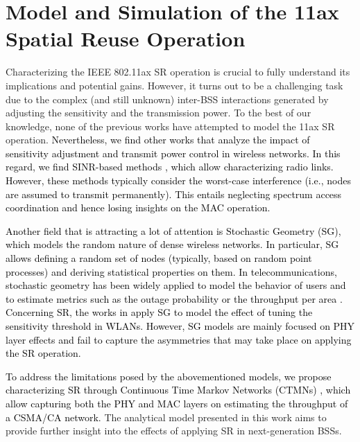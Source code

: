 \documentclass{article}
\begin{document}
\section{Model and Simulation of the 11ax Spatial Reuse Operation}
\label{section:analytical_model}

Characterizing the IEEE 802.11ax SR operation is crucial to fully understand its implications and potential gains. However, it turns out to be a challenging task due to the complex (and still unknown) inter-BSS interactions generated by adjusting the sensitivity and the transmission power. To the best of our knowledge, none of the previous works have attempted to model the 11ax SR operation. \textcolor{black}{Nevertheless, we find other works that analyze the impact of sensitivity adjustment and transmit power control in wireless networks. In this regard, we find SINR-based methods \cite{gupta2000capacity, guo2003spatial}, which allow characterizing radio links. However, these methods typically consider the worst-case interference (i.e., nodes are assumed to transmit permanently). This entails neglecting spectrum access coordination and hence losing insights on the MAC operation.}

\textcolor{black}{Another field that is attracting a lot of attention is Stochastic Geometry (SG), which models the random nature of dense wireless networks. In particular, SG allows defining a random set of nodes (typically, based on random point processes) and deriving statistical properties on them. In telecommunications, stochastic geometry has been widely applied to model the behavior of users and to estimate metrics such as the outage probability or the throughput per area \cite{elsawy2016modeling}. Concerning SR, the works in \cite{zhao2016stochastic, zhang2015stochastic, iwata2019stochastic} apply SG to model the effect of tuning the sensitivity threshold in WLANs. However, SG models are mainly focused on PHY layer effects and fail to capture the asymmetries that may take place on applying the SR operation.}

\textcolor{black}{To address the limitations posed by the abovementioned models, we propose characterizing SR through Continuous Time Markov Networks (CTMNs) \cite{bellalta2014throughput, bellalta2017throughput}, which allow capturing both the PHY and MAC layers on estimating the throughput of a CSMA/CA network.} The analytical model presented in this work aims to provide further insight into the effects of applying SR in next-generation BSSs.
\end{document}
